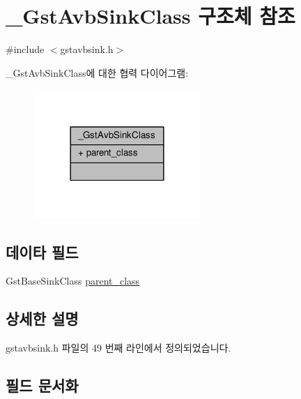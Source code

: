 \hypertarget{struct___gst_avb_sink_class}{}\section{\+\_\+\+Gst\+Avb\+Sink\+Class 구조체 참조}
\label{struct___gst_avb_sink_class}


{\ttfamily \#include $<$gstavbsink.\+h$>$}



\+\_\+\+Gst\+Avb\+Sink\+Class에 대한 협력 다이어그램\+:
\nopagebreak
\begin{figure}[H]
\begin{center}
\leavevmode
\includegraphics[width=180pt]{struct___gst_avb_sink_class__coll__graph}
\end{center}
\end{figure}
\subsection*{데이타 필드}
\begin{DoxyCompactItemize}
\item 
Gst\+Base\+Sink\+Class \hyperlink{struct___gst_avb_sink_class_a2bc403a7f110b207d2d90b189aff0d95}{parent\+\_\+class}
\end{DoxyCompactItemize}


\subsection{상세한 설명}


gstavbsink.\+h 파일의 49 번째 라인에서 정의되었습니다.



\subsection{필드 문서화}
